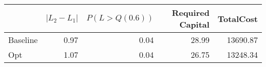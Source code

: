 \begin{tabular}{lrrrr}
\toprule
{} &  $|L_2 - L_1|$ &  $P(L > Q(0.6))$ &  Required Capital &  TotalCost \\
\midrule
Baseline &           0.97 &             0.04 &             28.99 &   13690.87 \\
Opt      &           1.07 &             0.04 &             26.75 &   13248.34 \\
\bottomrule
\end{tabular}
